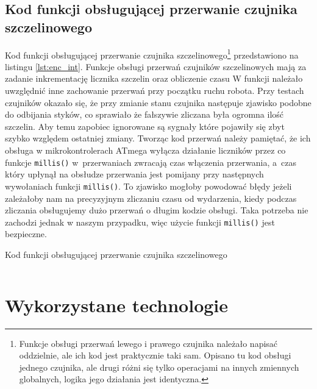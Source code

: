 \documentclass[11pt]{article}
\begin{document}
\subsection{Kod funkcji obsługującej przerwanie czujnika szczelinowego}
Kod funkcji obsługującej przerwanie czujnika szczelinowego\footnote{Funkcje obsługi przerwań lewego i prawego czujnika należało napisać oddzielnie, ale ich kod jest praktycznie taki sam.
Opisano tu kod obsługi jednego czujnika, ale drugi różni się tylko operacjami na innych zmiennych globalnych, logika jego działania jest identyczna.} przedstawiono na listingu \ref{lst:enc_int}.
Funkcje obsługi przerwań czujników szczelinowych mają za zadanie inkrementację licznika szczelin oraz obliczenie czasu
W funkcji należało uwzględnić inne zachowanie przerwań przy początku ruchu robota.
Przy testach czujników okazało się, że przy zmianie stanu czujnika następuje zjawisko podobne do odbijania styków, co sprawiało że fałszywie zliczana była ogromna ilość szczelin.
Aby temu zapobiec ignorowane są sygnały które pojawiły się zbyt szybko względem ostatniej zmiany.
Tworząc kod przerwań należy pamiętać, że ich obsługa w mikrokontrolerach ATmega wyłącza działanie liczników przez co funkcje \texttt{millis()} w~przerwaniach zwracają czas włączenia przerwania, a~czas który upłynął na obsłudze przerwania jest pomijany przy następnych wywołaniach funkcji \texttt{millis()}.
To zjawisko mogłoby powodować błędy jeżeli zależałoby nam na precyzyjnym zliczaniu czasu od wydarzenia, kiedy podczas zliczania obsługujemy dużo przerwań o długim kodzie obsługi.
Taka potrzeba nie zachodzi jednak w naszym przypadku, więc użycie funkcji \texttt{millis()} jest bezpieczne.


\begin{listing}[htb]
\caption{Kod funkcji obsługującej przerwanie czujnika szczelinowego}
\inputminted[firstline=185, lastline=206, frame=lines, linenos, breaklines]{cpp}{../src/platformMotors.cpp}
\label{lst:enc_int}
\end{listing}

\section{Wykorzystane technologie}
\end{document}
